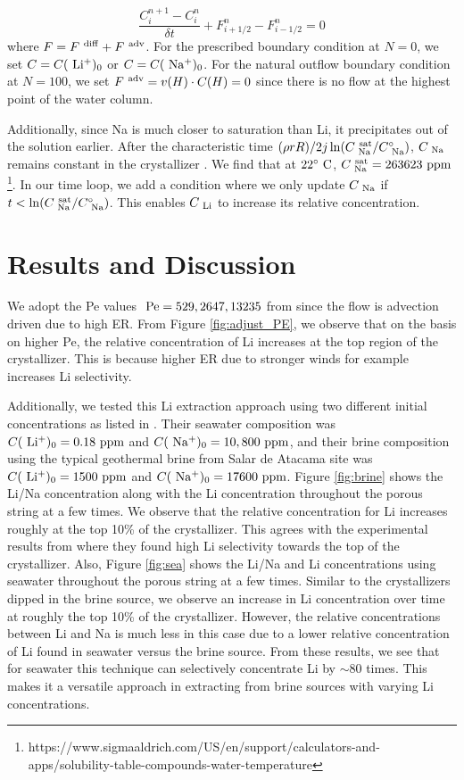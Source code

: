 \documentclass{article}
\begin{document}
\begin{equation}
    \frac{C^{n+1}_i - C^n_i}{\delta t} + F^n_{i+1/2} - F^n_{i-1/2} = 0
\end{equation}
where $F = F^{\rm~diff} + F^{\rm~adv}$. For the prescribed boundary condition at $N=0$, we set $C = C(\rm~Li^{+})_0$ or $C = C(\rm~Na^{+})_0$. For the natural outflow boundary condition at $N=100$, we set $F^{\rm~adv} = v(H)\cdot C(H) = 0$ since there is no flow at the highest point of the water column. 

Additionally, since Na is much closer to saturation than Li, it precipitates out of the solution earlier. After the characteristic time $(\rho rR)/2j\ln(C_{\rm~Na}^{\rm~sat}/C_{\rm~Na}^{\circ})$, $C_{\rm~Na}$ remains constant in the crystallizer \cite{Chen2023}. We find that at $22^\circ\rm~C$, $C_{\rm~Na}^{\rm~sat} = 263623\rm~ppm$\footnote{https://www.sigmaaldrich.com/US/en/support/calculators-and-apps/solubility-table-compounds-water-temperature}. In our time loop, we add a condition where we only update $C_{\rm~Na}$ if $t < \ln(C_{\rm~Na}^{\rm~sat}/C_{\rm~Na}^{\circ})$. This enables $C_{\rm~Li}$ to increase its relative concentration. 

\section*{Results and Discussion}

We adopt the Pe values $\rm~Pe = 529, 2647, 13235$ from \cite{Chen2023} since the flow is advection driven due to high ER. From Figure \ref{fig:adjust_PE}, we observe that on the basis on higher Pe, the relative concentration of Li increases at the top region of the crystallizer. This is because higher ER due to stronger winds for example increases Li selectivity.

Additionally, we tested this Li extraction approach using two different initial concentrations as listed in \cite{Chen2023}. Their seawater composition was $ C(\rm~Li^{+})_0=0.18\rm~ppm$ and $C(\rm~Na^{+})_0=10,800\rm~ppm$, and their brine composition using the typical geothermal brine from Salar de Atacama site was $ C(\rm~Li^{+})_0=1500\rm~ppm$ and $C(\rm~Na^{+})_0=17600\rm~ppm$.  Figure \ref{fig:brine} shows the Li/Na concentration along with the Li concentration throughout the porous string at a few times. We observe that the relative concentration for Li increases roughly at the top 10\% of the crystallizer. This agrees with the experimental results from \cite{Chen2023} where they found high Li selectivity towards the top of the crystallizer. Also, Figure \ref{fig:sea} shows the Li/Na and Li concentrations using seawater throughout the porous string at a few times. Similar to the crystallizers dipped in the brine source, we observe an increase in Li concentration over time at roughly the top 10\% of the crystallizer. However, the relative concentrations between Li and Na is much less in this case due to a lower relative concentration of Li found in seawater versus the brine source. From these results, we see that for seawater this technique can selectively concentrate Li by $\sim80$ times. This makes it a versatile approach in extracting from brine sources with varying Li concentrations. 
\end{document}
